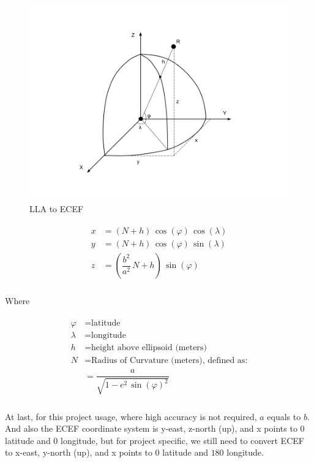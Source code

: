 \begin{figure}[H]
\caption{LLA to ECEF}
\label{fig:lla2ecef}
\centering
\includegraphics[width=\linewidth]{Figures/lla2ecef.png}
\decoRule
\end{figure}

\[
\begin{array}{lr}
\begin{aligned}
x &= (N + h)\,\cos(\varphi)\,\cos(\lambda)\\
y &= (N + h)\,\cos(\varphi)\,\sin(\lambda)\\
z &= (\dfrac{b^2}{a^2}\,N + h)\,\sin(\varphi)\\
\end{aligned}
\end{array}
\]

Where

\[
\begin{array}{lr}
\begin{aligned}
\varphi &= \text{latitude}\\
\lambda &= \text{longitude}\\
h &= \text{height above ellipsoid (meters)}\\
N &= \text{Radius of Curvature (meters), defined as:}\\
&= \dfrac{a}{\sqrt{1 - e^2\,\sin(\varphi)^2}}\\
\end{aligned}
\end{array}
\]

At last, for this project usage, where high accuracy is not required, $a$ equals to $b$. And also the ECEF coordinate system is y-east, z-north (up), and x points to $0$ latitude and $0$ longitude, but for project specific, we still need to convert ECEF to x-east, y-north (up), and x points to $0$ latitude and $180$ longitude.

